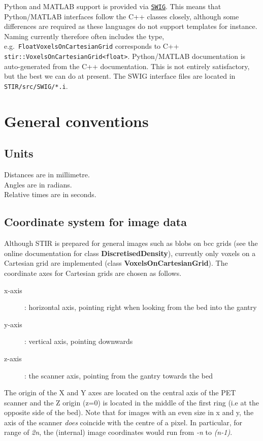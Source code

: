 \documentclass{article}
\def\R2Lurl#1#2{\mbox{\href{#1}{\tt #2}}}
\begin{document}
Python and MATLAB support is provided via \R2Lurl{http://www.swig.org/}{SWIG}. This means that Python/MATLAB interfaces follow
the C++ classes closely, although some differences are required as these languages do not support templates for instance.
Naming currently therefore often includes the type, e.g.~\texttt{FloatVoxelsOnCartesianGrid} corresponds to
C++ \texttt{stir::VoxelsOnCartesianGrid<float>}. Python/MATLAB documentation is auto-generated from the C++
documentation. This is not entirely satisfactory, but the best we can do at present.
The SWIG interface files are located in \texttt{STIR/src/SWIG/*.i}.

\section{
General conventions}



\subsection{
Units }

Distances are in millimetre.\\
Angles are in radians.\\
Relative times are in seconds.

\subsection{
Coordinate system for image data }

Although STIR is prepared for general images such as blobs on 
bcc grids (see the online documentation for class \textbf{DiscretisedDensity}), 
currently only voxels on a Cartesian grid are implemented (class \textbf{VoxelsOnCartesianGrid}). 
The coordinate axes for Cartesian grids are chosen as follows.
\begin{description}
\item[x-axis] : horizontal axis, pointing right when looking from 
the bed into the gantry
\item[y-axis] : vertical axis, pointing downwards
\item[z-axis] : the scanner axis, pointing from the gantry towards 
the bed
\end{description}
The origin of the X and Y axes are located on the central axis 
of the PET scanner and the Z origin (z=0) is located in the middle 
of the first ring (i.e at the opposite side of the bed). Note 
that for images with an even size in x and y, the axis of the 
scanner \textit{does} coincide with the centre of a pixel. In particular, 
for range of \textit{2n}, the (internal) image coordinates would run 
from \textit{-n} to \textit{(n-1)}.
\end{document}
